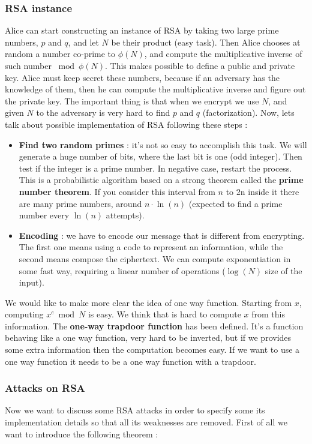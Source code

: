 \documentclass[11pt]{article}
\begin{document}
\subsubsection{RSA instance}
Alice can start constructing an instance of RSA by taking two large prime numbers, $p$ and $q$, and let $N$ be their product (easy task). Then Alice chooses at random a number co-prime to $\phi(N)$, and compute the multiplicative inverse of such number $\bmod \phi(N)$. This makes possible to define a public and private key. Alice must keep secret these numbers, because if an adversary has the knowledge of them, then he can compute the multiplicative inverse and figure out the private key. The important thing is that when we encrypt we use $N$, and given $N$ to the adversary is very hard to find $p$ and $q$ (factorization). Now, lets talk about possible implementation of RSA following these steps :
\begin{itemize}
\item \textbf{Find two random primes} : it's not so easy to accomplish this task. We will generate a huge number of bits, where the last bit is one (odd integer). Then test if the integer is a prime number. In negative case, restart the process. This is a probabilistic algorithm based on a strong theorem called the \textbf{prime number theorem}. If you consider this interval from $n$ to $2$n inside it there are many prime numbers, around $n \cdot \ln(n)$ (expected to find a prime number every $\ln(n)$ attempts).
\item \textbf{Encoding} : we have to encode our message that is different from encrypting. The first one means using a code to represent an information, while the second means compose the ciphertext. We can compute exponentiation in some fast way, requiring a linear number of operations ($\log(N)$ size of the input).
\end{itemize}
We would like to make more clear the idea of one way function. Starting from $x$, computing $x^e \bmod N$ is easy. We think that is hard to compute $x$ from this information. The \textbf{one-way trapdoor function} has been defined. It's a function behaving like a one way function, very hard to be inverted, but if we provides some extra information then the computation becomes easy. If we want to use a one way function it needs to be a one way function with a trapdoor.
\subsubsection{Attacks on RSA}
Now we want to discuss some RSA attacks in order to specify some its implementation details so that all its weaknesses are removed. First of all we want to introduce the following theorem :
\end{document}
